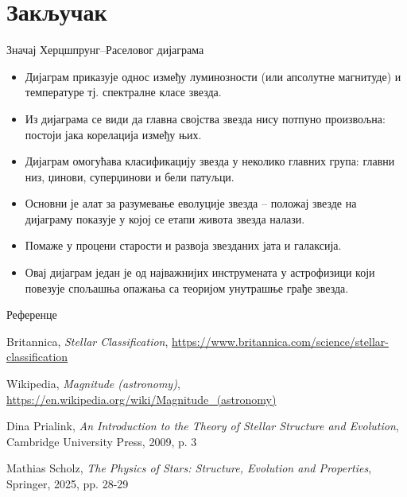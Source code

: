 \documentclass[aspectratio=169, xcolor=table, 10pt]{beamer}
\theoremstyle{definition}
\begin{document}
\section{Закључак}

\begin{frame}{Значај Херцшпрунг–Раселовог дијаграма}
  \begin{itemize}
    \item Дијаграм приказује однос између луминозности (или апсолутне магнитуде) и температуре тј. спектралне класе звезда.
    \item Из дијаграма се види да главна својства звезда нису потпуно произвољна: постоји јака корелација између њих.
    \item Дијаграм омогућава класификацију звезда у неколико главних група: главни низ, џинови, суперџинови и бели патуљци.
    \item Основни је алат за разумевање еволуције звезда – положај звезде на дијаграму показује у којој се етапи живота звезда налази.
    \item Помаже у процени старости и развоја звезданих јата и галаксија.
    \item Овај дијаграм један је од најважнијих инструмената у астрофизици који повезује спољашња опажања са теоријом унутрашње грађе звезда.
  \end{itemize}
\end{frame}

\begin{frame}{Референце}
    \begin{thebibliography}{9}

      Britannica,
      \textit{Stellar Classification},
      \url{https://www.britannica.com/science/stellar-classification}

      Wikipedia,
      \textit{Magnitude (astronomy)},
      \url{https://en.wikipedia.org/wiki/Magnitude_(astronomy)}

      Dina Prialink,
      \textit{An Introduction to the Theory of Stellar Structure and Evolution},
      Cambridge University Press, 2009, p. 3

      Mathias Scholz,
      \textit{The Physics of Stars: Structure, Evolution and Properties},
      Springer, 2025, pp. 28-29

    \end{thebibliography}
\end{frame}
\end{document}
